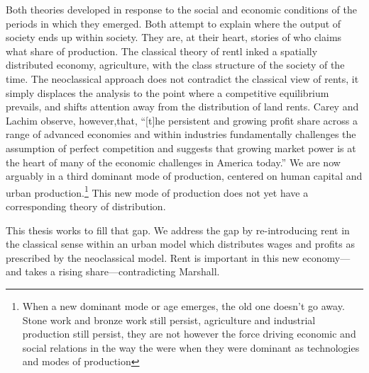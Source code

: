 Both theories developed in response to the social and economic conditions of the periods in which they emerged. Both attempt to explain where the output of society ends up within society. They are, at their heart, stories of who %
claims what share of production.
The classical theory of rentl inked a spatially distributed economy, agriculture, with the class structure of the society of the time. 
The neoclassical approach does not contradict the classical view of rents, it simply displaces the analysis to the point where a competitive equilibrium prevails, and shifts attention away from the distribution of land rents.  Carey and Lachim \cite{careySomethingNothingHow2019} observe,  however,that, ``[t]he persistent and growing profit share across a range of advanced economies and within industries fundamentally challenges the assumption of perfect competition and suggests that growing market power is at the heart of many of the economic challenges in America today.'' We are now arguably in a third dominant mode of production, centered on  human capital and urban production.\footnote{When a new dominant mode or age emerges, the old one doesn't go away. Stone work and bronze work still persist, agriculture and industrial production still persist, they are not however the force driving economic and social relations in the way the were when they were dominant as technologies and modes of production\cite{oldworldsdon'tdie}} This  new mode of production  does not yet have a corresponding theory of distribution.

This thesis works to fill that gap. We address the gap by re-introducing rent in the classical sense within an urban model which distributes wages and profits as prescribed by  the neoclassical model. Rent is important in this new economy---and takes a rising share---contradicting Marshall. 


 
